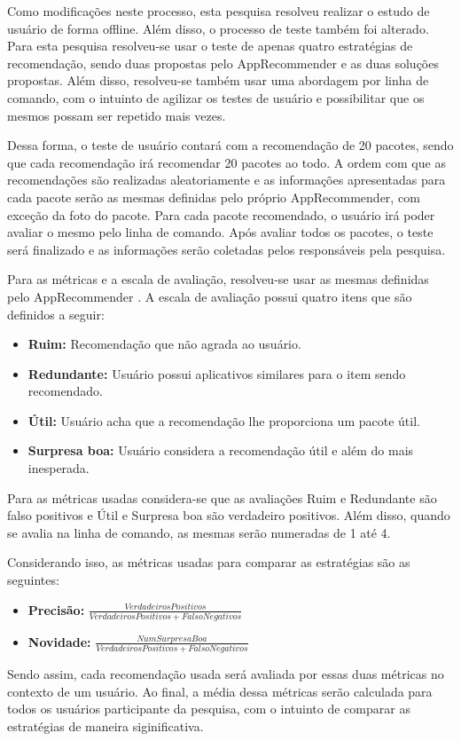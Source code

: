 Como modificações neste processo, esta pesquisa resolveu realizar o estudo de
usuário de forma offline. Além disso, o processo de teste também foi alterado.
Para esta pesquisa resolveu-se usar o teste de apenas quatro estratégias de
recomendação, sendo duas propostas pelo AppRecommender e as duas soluções
propostas. Além disso, resolveu-se também usar uma abordagem por linha de
comando, com o intuinto de agilizar os testes de usuário e possibilitar que os
mesmos possam ser repetido mais vezes.

Dessa forma, o teste de usuário contará com a recomendação de 20 pacotes,
sendo que cada recomendação irá recomendar 20 pacotes ao todo. A ordem com que
as recomendações são realizadas aleatoriamente e as informações apresentadas
para cada pacote serão as mesmas definidas pelo próprio AppRecommender, com
exceção da foto do pacote. Para cada pacote recomendado, o usuário irá poder
avaliar o mesmo pelo linha de comando. Após avaliar todos os pacotes, o teste
será finalizado e as informações serão coletadas pelos responsáveis pela
pesquisa.

Para as métricas e a escala de avaliação, resolveu-se usar as mesmas definidas
pelo AppRecommender \cite{araujo2011apprecommender}. A escala de avaliação
possui quatro itens que são definidos a seguir:

\begin{itemize}
    \item \textbf{Ruim: } Recomendação que não agrada ao usuário.
    \item \textbf{Redundante: } Usuário possui aplicativos similares para o item
        sendo recomendado.
    \item \textbf{Útil: } Usuário acha que a recomendação lhe proporciona um
            pacote útil.
    \item \textbf{Surpresa boa: } Usuário considera a recomendação útil e além
        do mais inesperada.
\end{itemize}

Para as métricas usadas considera-se que as avaliações Ruim e Redundante são
falso positivos e Útil e Surpresa boa são verdadeiro positivos. Além disso,
quando se avalia na linha de comando, as mesmas serão numeradas de 1 até 4.

Considerando isso, as métricas usadas para comparar as estratégias são as
seguintes:

\begin{itemize}
    \item \textbf{Precisão: } $\frac{VerdadeirosPositivos}{VerdadeirosPositivos
        + FalsoNegativos}$
    \item \textbf{Novidade: } $\frac{NumSurpresaBoa}{VerdadeirosPositivos +
        FalsoNegativos}$
\end{itemize}

Sendo assim, cada recomendação usada será avaliada por essas duas métricas no
contexto de um usuário. Ao final, a média dessa métricas serão calculada para
todos os usuários participante da pesquisa, com o intuinto de comparar as
estratégias de maneira siginificativa.

